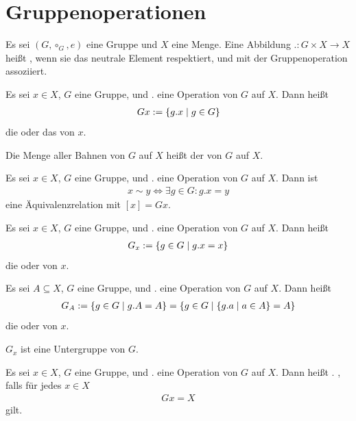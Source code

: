 \documentclass{report}
\begin{document}
\chapter{Gruppenoperationen}
\begin{definition}
	Es sei $(G, \circ_G, e)$ eine Gruppe und $X$ eine Menge. Eine Abbildung $. : G \times X \to X$ heißt , wenn sie das neutrale Element respektiert, und mit der Gruppenoperation assoziiert.
\end{definition}
\begin{definition}
	Es sei $x \in X$, $G$ eine Gruppe, und $.$ eine Operation von $G$ auf $X$. Dann heißt
	\begin{align*}
		Gx := \qty{g.x \mid g \in G}
	\end{align*}
	die  oder das  von $x$.
\end{definition}
\begin{definition}
	Die Menge aller Bahnen von $G$ auf $X$ heißt der  von $G$ auf $X$.
\end{definition}
\begin{lemma}
	Es sei $x \in X$, $G$ eine Gruppe, und $.$ eine Operation von $G$ auf $X$. Dann ist
	\begin{align*}
		x \sim y \Leftrightarrow \exists g \in G : g.x = y
	\end{align*}
	eine Äquivalenzrelation mit $[x] = Gx$.
\end{lemma}
\begin{definition}
	Es sei $x \in X$, $G$ eine Gruppe, und $.$ eine Operation von $G$ auf $X$. Dann heißt
	\begin{align*}
		G_x := \qty{g \in G \mid g.x = x}
	\end{align*}
	die  oder  von $x$.
\end{definition}
\begin{definition}
	Es sei $A \subseteq X$, $G$ eine Gruppe, und $.$ eine Operation von $G$ auf $X$. Dann heißt
	\begin{align*}
		G_A := \qty{g \in G \mid g.A = A} = \qty{g \in G \mid \qty{g.a \mid a \in A} = A}
	\end{align*}
	die  oder  von $x$.
\end{definition}
\begin{lemma}
	$G_x$ ist eine Untergruppe von $G$.
\end{lemma}
\begin{definition}
	Es sei $x \in X$, $G$ eine Gruppe, und $.$ eine Operation von $G$ auf $X$. Dann heißt $.$ , falls für jedes $x \in X$
	\begin{align*}
		Gx = X
	\end{align*}
	gilt.
\end{definition}
\end{document}
